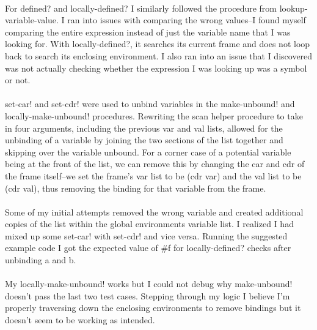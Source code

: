 \documentclass[a4paper,12pt]{article}
\begin{document}
\\
For defined? and locally-defined? I similarly followed the procedure from lookup-variable-value. I ran into issues with comparing the wrong values--I found myself comparing the entire expression instead of just the variable name that I was looking for. With locally-defined?, it searches its current frame and does not loop back to search its enclosing environment. I also ran into an issue that I discovered was not actually checking whether the expression I was looking up was a symbol or not.\\
\\
set-car! and set-cdr! were used to unbind variables in the make-unbound! and locally-make-unbound! procedures. Rewriting the scan helper procedure to take in four arguments, including the previous var and val lists, allowed for the unbinding of a variable by joining the two sections of the list together and skipping over the variable unbound. For a corner case of a potential variable being at the front of the list, we can remove this by changing the car and cdr of the frame itself--we set the frame's var list to be (cdr var) and the val list to be (cdr val), thus removing the binding for that variable from the frame.\\
\\
Some of my initial attempts removed the wrong variable and created additional copies of the list within the global environments variable list. I realized I had mixed up some set-car! with set-cdr! and vice versa. Running the suggested example code I got the expected value of \#f for locally-defined? checks after unbinding a and b.\\
\\
My locally-make-unbound! works but I could not debug why make-unbound! doesn't pass the last two test cases. Stepping through my logic I believe I'm properly traversing down the enclosing environments to remove bindings but it doesn't seem to be working as intended.



%

%
	
\end{document}
